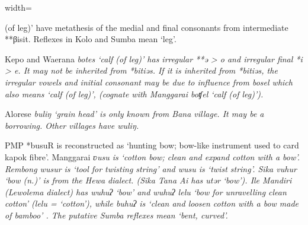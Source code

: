 \begin{table}[p]
\begin{adjustbox}{width=\textwidth}
\begin{threeparttable}
\begin{tablenotes}
{									(of leg)’ have metathesis of the medial
									and final consonants from intermediate **βisit.
									Reflexes in Kolo and Sumba mean ‘leg’.}
				\item[‡]	{Kepo{\Q} and Waerana \it{botes} ‘calf (of leg)’ has irregular
									**ə > \it{o} and irregular final *i > \it{e}.
									It may not be inherited from *bitiəs.
									If it is inherited from *bitiəs,
									the irregular vowels and initial consonant may be due to influence
									from \it{bosel} which also means ‘calf (of leg)’,
									(cognate with Manggarai boʧel ‘calf (of leg)’).}
				\item[Δ]	{Alorese \it{buliŋ}
									‘grain head’ is only known from Bana village.
									It may be a borrowing.
									Other villages have \it{wuliŋ.}}
				\item[‖]	{PMP *busuR is reconstructed as
									‘hunting bow; bow-like
									instrument used to card kapok fibre’.
									Manggarai \it{ʋusu} is ‘cotton bow; clean
									and expand cotton with a bow’.
									Rembong \it{wusur} is ‘tool for
									twisting string’ and \it{wusu} is ‘twist string’.
									Sika \it{vuhur} ‘bow (n.)’ is from the Hewa dialect.
									(Sika Tana Ai has \it{utər} ‘bow’).
									Ile Mandiri (Lewolema dialect) has \it{wuhuʔ} ‘bow’
									and \it{wuhuʔ lelu} ‘bow for unravelling clean cotton’ (\it{lelu}
									= ‘cotton’), while \it{buhuʔ} is \it{‘}clean
									and loosen cotton with a bow made of bamboo’ \citep[39]{Pampus2010}.
									The putative Sumba reflexes mean ‘bent, curved’.}
			\end{tablenotes}
	\end{threeparttable}
\end{adjustbox}
\end{table}

